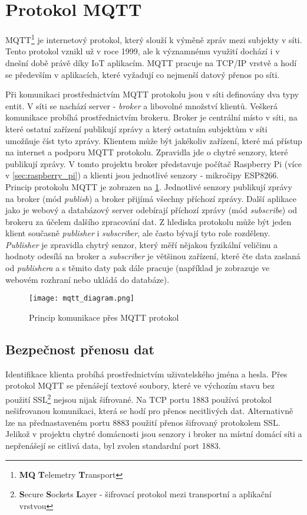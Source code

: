 \section{Protokol MQTT} \label{sec:protocol_mqtt}
MQTT\footnote{\textbf{MQ} \textbf{T}elemetry \textbf{T}ransport} je internetový protokol, který slouží k výměně zpráv mezi subjekty v síti. Tento protokol vznikl už v roce 1999, ale k významnému využití dochází i v dnešní době právě díky IoT aplikacím. MQTT pracuje na TCP/IP vrstvě a hodí se především v aplikacích, které vyžadují co nejmenší datový přenos po síti.  \par
Při komunikaci prostřednictvím MQTT protokolu jsou v síti definovány dva typy entit. V síti se nachází server - \textit{broker} a libovolné množství klientů. Veškerá komunikace probíhá prostřednictvím brokeru. Broker je centrální místo v síti, na které ostatní zařízení publikují zprávy a který ostatním subjektům v síti umožňuje číst tyto zprávy. Klientem může být jakékoliv zařízení, které má přístup na internet a podporu MQTT protokolu. Zpravidla jde o chytré senzory, které publikují zprávy. V tomto projektu broker představuje počítač Raspberry Pi (více v \cref{sec:raspberry_pi}) a klienti jsou jednotlivé senzory - mikročipy ESP8266. Princip protokolu MQTT je zobrazen na \cref{fig:mqtt_communication}. Jednotlivé senzory publikují zprávy na broker (mód \textit{publish}) a broker přijímá všechny příchozí zprávy. Další aplikace jako je webový a databázový server odebírají příchozí zprávy (mód \textit{subscribe}) od brokeru za účelem dalšího zpracování dat. Z hlediska protokolu může být jeden klient současně \textit{publisher} i \textit{subscriber}, ale často bývají tyto role rozděleny. \textit{Publisher} je zpravidla chytrý senzor, který měří nějakou fyzikální veličinu a hodnoty odesílá na broker a \textit{subscriber} je většinou zařízení, které čte data zaslaná od \textit{publishera} a s těmito daty pak dále pracuje (například je zobrazuje ve webovém rozhraní nebo ukládá do databáze).  

\begin{figure}[H]
  \centering
  \texttt{[image: mqtt\_diagram.png]}
  \caption{Princip komunikace přes MQTT protokol}
  \label{fig:mqtt_communication}
\end{figure}

\subsection*{Bezpečnost přenosu dat}
Identifikace klienta probíhá prostřednictvím uživatelského jména a hesla. Přes protokol MQTT se přenášejí textové soubory, které ve výchozím stavu bez použití SSL\footnote{\textbf{S}ecure \textbf{S}ockets \textbf{L}ayer - šifrovací protokol mezi transportní a aplikační vrstvou} nejsou nijak šifrované. Na TCP portu 1883 používá protokol nešifrovanou komunikaci, která se hodí pro přenos necitlivých dat. Alternativně lze na přednastaveném portu 8883 použití přenos šifrovaný protokolem SSL. Jelikož v projektu chytré domácnosti jsou senzory i broker na místní domácí síti a nepřenášejí se citlivá data, byl zvolen standardní port 1883.


